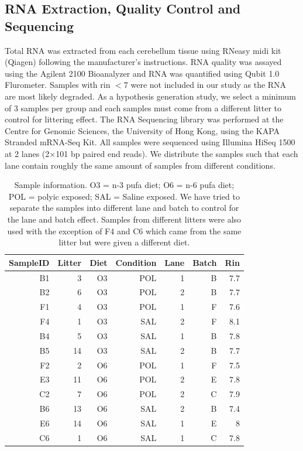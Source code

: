 \subsection{RNA Extraction, Quality Control and Sequencing}
Total RNA was extracted from each cerebellum tissue using RNeasy midi kit (Qiagen) following the manufacturer's instructions.
RNA quality was assayed using the Agilent 2100 Bioanalyzer and RNA was quantified using Qubit 1.0 Flurometer.
Samples with \gls{rin} $<7$ were not included in our study as the RNA are most likely degraded.
As a hypothesis generation study, we select a minimum of 3 samples per group and each samples must come from a different litter to control for littering effect.
The RNA Sequencing library was performed at the Centre for Genomic Sciences, the University of Hong Kong, using the KAPA Stranded mRNA-Seq Kit. 
All samples were sequenced using Illumina HiSeq 1500 at 2 lanes (2$\times$101 \gls{bp} paired end reads).
We distribute the samples such that each lane contain roughly the same amount of samples from different conditions.
\begin{table}
	\centering
	\begin{tabular}{rrrrrrr}
		\toprule
		SampleID & Litter & Diet & Condition & Lane & Batch & Rin\\
		\midrule
		B1&	3&	O3&	POL&	1&	B&	7.7\\
		B2&	6&	O3&	POL&	2&	B&	7.7\\
		F1&	4&	O3&	POL&	1&	F&	7.6\\
		F4&	1&	O3&	SAL&	2&	F&	8.1\\
		B4&	5&	O3&	SAL&	1&	B&	7.8\\
		B5&	14&	O3&	SAL&	2&	B&	7.7\\
		F2&	2&	O6&	POL&	1&	F&	7.5\\
		E3&	11&	O6&	POL&	2&	E&	7.8\\
		C2&	7&	O6&	POL&	2&	C&	7.9\\
		B6&	13&	O6&	SAL&	2&	B&	7.4\\
		E6&	14&	O6&	SAL&	1&	E&	8\\
		C6&	1&	O6&	SAL&	1&	C&	7.8\\
		\bottomrule
	\end{tabular}
	\caption[Sample Information]{
		Sample information.
		O3 = n-3 \gls{pufa} diet; O6 = n-6 \gls{pufa} diet; POL = \gls{polyic} exposed; SAL = Saline exposed.
		We have tried to separate the samples into different lane and batch to control for the lane and batch effect. 
		Samples from different litters were also used with the exception of F4 and C6 which came from the same litter but were given a different diet.
		\label{tab:sampleInfo}
	}
\end{table}
